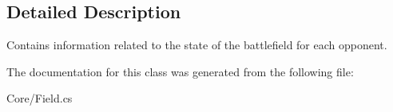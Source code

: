 \subsection{Detailed Description}
Contains information related to the state of the battlefield for each opponent.

The documentation for this class was generated from the following file\-:\begin{DoxyCompactItemize}
\item 
Core/Field.\-cs\end{DoxyCompactItemize}
